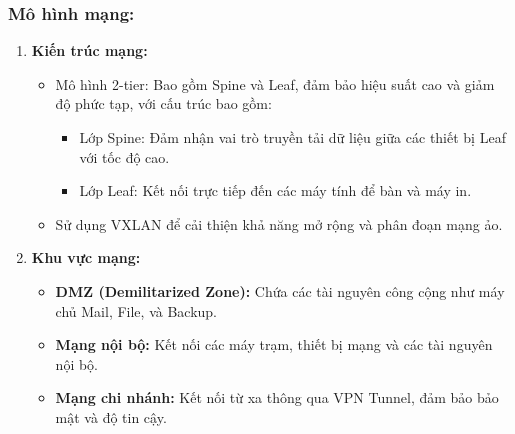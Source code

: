 \documentclass[13pt]{article}
\begin{document}
\subsubsection{Mô hình mạng:}
\begin{enumerate}
    \item \textbf{Kiến trúc mạng:}
    \begin{itemize}
        \item Mô hình 2-tier: Bao gồm Spine và Leaf, đảm bảo hiệu suất cao và giảm độ phức tạp, với cấu trúc bao gồm:
        \begin{itemize}
            \item Lớp Spine: Đảm nhận vai trò truyền tải dữ liệu giữa các thiết bị Leaf với tốc độ cao.
            \item Lớp Leaf: Kết nối trực tiếp đến các máy tính để bàn và máy in.
        \end{itemize}
        \item Sử dụng VXLAN để cải thiện khả năng mở rộng và phân đoạn mạng ảo.
    \end{itemize}
    
    \item \textbf{Khu vực mạng:}
    \begin{itemize}
        \item \textbf{DMZ (Demilitarized Zone): }Chứa các tài nguyên công cộng như máy chủ Mail, File, và Backup.
        \item \textbf{Mạng nội bộ: }Kết nối các máy trạm, thiết bị mạng và các tài nguyên nội bộ.
        \item \textbf{Mạng chi nhánh: }Kết nối từ xa thông qua VPN Tunnel, đảm bảo bảo mật và độ tin cậy.
    \end{itemize}
\end{enumerate}
\end{document}
